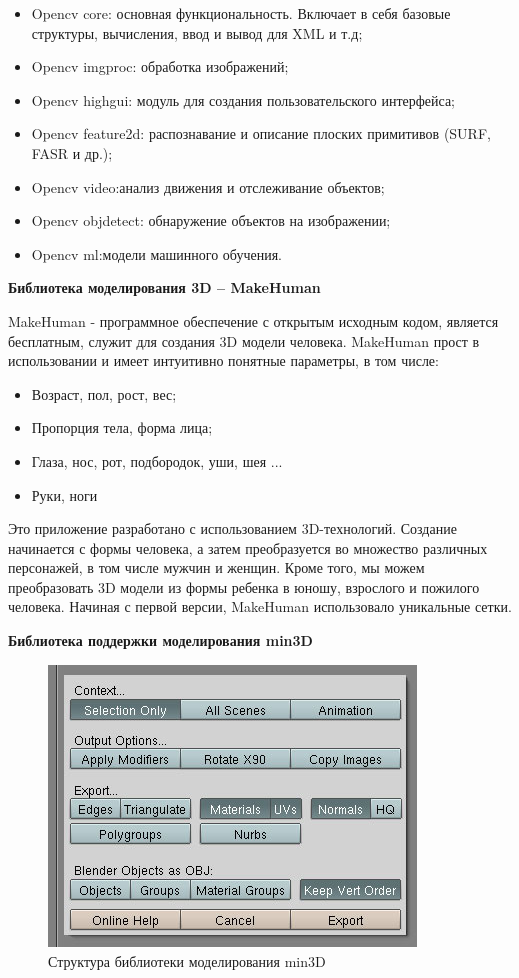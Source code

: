 \begin{itemize}
	\item Opencv core: основная функциональность. Включает в себя базовые структуры, вычисления, ввод и вывод для XML и т.д;
	\item Opencv imgproc: обработка изображений;
	\item Opencv highgui: модуль для создания пользовательского интерфейса;
	\item Opencv feature2d: распознавание и описание плоских примитивов (SURF, FASR и др.);
	\item Opencv video:анализ движения и отслеживание объектов;
	\item Opencv objdetect: обнаружение объектов на изображении;
	\item Opencv ml:модели машинного обучения.	
\end{itemize}

\textbf{Библиотека моделирования 3D – MakeHuman}

MakeHuman - программное обеспечение с открытым исходным кодом, является бесплатным, служит для создания 3D модели человека. MakeHuman прост в использовании и имеет интуитивно понятные параметры, в том числе:

\begin{itemize}
	\item Возраст, пол, рост, вес;
	\item Пропорция тела, форма лица;
	\item Глаза, нос, рот, подбородок, уши, шея ...
	\item Руки, ноги

\end{itemize}

Это приложение разработано с использованием 3D-технологий. Создание начинается с формы человека, а затем преобразуется во множество различных персонажей, в том числе мужчин и женщин. Кроме того, мы можем преобразовать 3D модели из формы ребенка в юношу, взрослого и пожилого человека. Начиная с первой версии, MakeHuman использовало уникальные сетки.  

\textbf{Библиотека поддержки моделирования min3D}
\begin{figure}[ht!]
\centering
\includegraphics [scale=1] {images/h32.png}
\begin{center}
\caption{Структура библиотеки моделирования min3D} \label{img32}
\end{center}
\end{figure}

